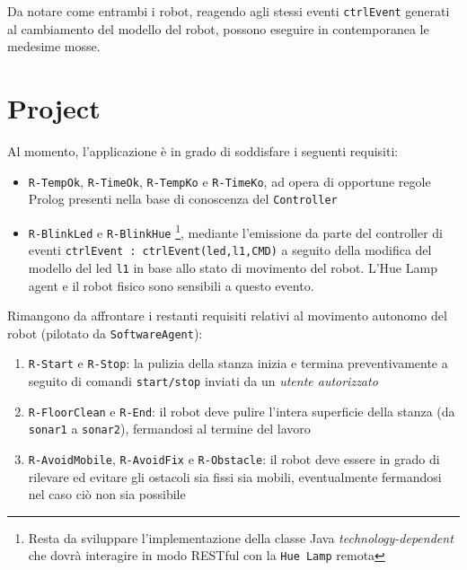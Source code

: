 \documentclass{../llncs}
\newcommand{\codescript}[1]{{\mbox{\small{\texttt{#1}}}}\xspace}
\newcommand{\code}[1]{{\color{blue}\small{\texttt{#1}}}}
\newcommand{\labelsec}[1]{\label{sec:#1}}
\begin{document}


\vspace{8px}

Da notare come entrambi i robot, reagendo agli stessi eventi \codescript{ctrlEvent} generati al cambiamento del modello del robot, possono eseguire in contemporanea le medesime mosse.

\section{Project}
\labelsec{Project}
Al momento, l'applicazione è in grado di soddisfare i seguenti requisiti:
\begin{itemize}
\item \code{R-TempOk}, \code{R-TimeOk}, \code{R-TempKo} e \code{R-TimeKo}, ad opera di opportune regole Prolog presenti nella base di conoscenza del \texttt{Controller}
\item \code{R-BlinkLed} e \code{R-BlinkHue}
\footnote{Resta da sviluppare l'implementazione della classe Java \emph{technology-dependent} che dovrà interagire in modo RESTful con la \texttt{Hue Lamp} remota}, mediante l'emissione da parte del controller di eventi \codescript{ctrlEvent : ctrlEvent(led,l1,CMD)} a seguito della modifica del modello del led \codescript{l1} in base allo stato di movimento del robot. L'Hue Lamp agent e il robot fisico sono sensibili a questo evento.
\end{itemize}

Rimangono da affrontare i restanti requisiti relativi al movimento autonomo del robot (pilotato da \texttt{SoftwareAgent}):
\begin{enumerate}
\item \code{R-Start} e \code{R-Stop}: la pulizia della stanza inizia e termina preventivamente a seguito di comandi \texttt{start/stop} inviati da un \emph{utente autorizzato}
\item \code{R-FloorClean} e \code{R-End}: il robot deve pulire l'intera superficie della stanza (da \code{sonar1} a \code{sonar2}), fermandosi al termine del lavoro
\item \code{R-AvoidMobile}, \code{R-AvoidFix} e \code{R-Obstacle}: il robot deve essere in grado di rilevare ed evitare gli ostacoli sia fissi sia mobili, eventualmente fermandosi nel caso ciò non sia possibile
\end{enumerate}
\end{document}
